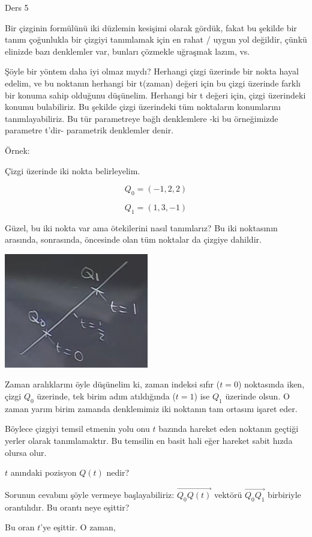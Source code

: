 \documentclass[12pt,fleqn]{article}\usepackage{../../common}
\begin{document}
Ders 5

Bir çizginin formülünü iki düzlemin kesişimi olarak gördük, fakat bu
şekilde bir tanım çoğunlukla bir çizgiyi tanımlamak için en rahat / uygun
yol değildir, çünkü elinizde bazı denklemler var, bunları çözmekle uğraşmak
lazım, vs. 

Şöyle bir yöntem daha iyi olmaz mıydı? Herhangi çizgi üzerinde bir nokta hayal 
edelim, ve bu noktanın herhangi bir t(zaman) değeri için bu çizgi üzerinde 
farklı bir konuma sahip olduğunu düşünelim. Herhangi bir t değeri için, çizgi 
üzerindeki konumu bulabiliriz. Bu şekilde çizgi üzerindeki tüm noktaların 
konumlarını tanımlayabiliriz. Bu tür parametreye bağlı denklemlere -ki bu 
örneğimizde parametre t'dir- parametrik denklemler denir. 

Örnek:

Çizgi üzerinde iki nokta belirleyelim. 

$$ Q_0 = (-1,2,2) $$

$$ Q_1 = (1,3,-1) $$

Güzel, bu iki nokta var ama ötekilerini nasıl tanımlarız? Bu iki noktasının
arasında, sonrasında, öncesinde olan tüm noktalar da çizgiye dahildir. 

\includegraphics[height=5cm]{5_1.png}

Zaman aralıklarını öyle düşünelim ki, zaman indeksi sıfır ($t=0$) noktasında
iken, çizgi $Q_0$ üzerinde, tek birim adım atıldığında ($t=1$) ise $Q_1$
üzerinde olsun. O zaman yarım birim zamanda denklemimiz iki noktanın tam
ortasını işaret eder.

Böylece çizgiyi temsil etmenin yolu onu $t$ bazında hareket eden noktanın
geçtiği yerler olarak tanımlamaktır. Bu temsilin en basit hali eğer hareket
sabit hızda olursa olur. 

$t$ anındaki pozisyon $Q(t)$ nedir? 

Sorunun cevabını şöyle vermeye başlayabiliriz: $\vec{Q_0Q(t)}$ vektörü
$\vec{Q_0Q_1}$ birbiriyle orantılıdır. Bu orantı neye eşittir?

Bu oran $t$'ye eşittir. O zaman,
\end{document}
